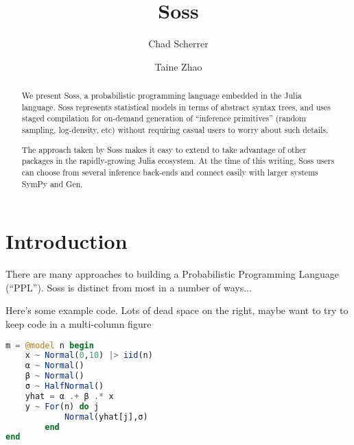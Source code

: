 \documentclass[anonymous=false, %
               format=acmsmall, %
               review=true, %
               screen=true, %
               nonacm=true]{acmart}
\begin{document}
\title{Soss}

\author{Chad Scherrer}

\author{Taine Zhao}

\begin{abstract}
We present Soss, a probabilistic programming language embedded in the Julia language. Soss represents statistical models in terms of abstract syntax trees, and uses staged compilation for on-demand generation of ``inference primitives'' (random sampling, log-density, etc) without requiring casual users to worry about such details.

The approach taken by Soss makes it easy to extend to take advantage of other packages in the rapidly-growing Julia ecosystem. At the time of this writing, Soss users can choose from several inference back-ends and connect easily with larger systems SymPy and Gen.
\end{abstract}

\maketitle

\section{Introduction}

There are many approaches to building a Probabilistic Programming Language (``PPL''). Soss is distinct from most in a number of ways...

Here's some example code. Lots of dead space on the right, maybe want to try to keep code in a multi-column figure

\begin{lstlisting}[language = Julia]
m = @model n begin
    x ~ Normal(0,10) |> iid(n)
    α ~ Normal()
    β ~ Normal()
    σ ~ HalfNormal()
    yhat = α .+ β .* x
    y ~ For(n) do j 
            Normal(yhat[j],σ)
        end
end
\end{lstlisting} 
  
\end{document}
